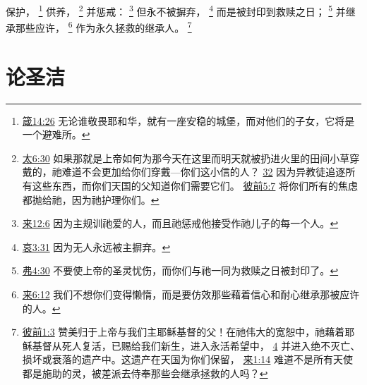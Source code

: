 \documentclass[12pt, a4paper, oneside]{ctexart}
\begin{document}
	保护，
	\footnote {
		\href{https://biblehub.com/proverbs/14-26.htm}{箴14:26} 无论谁敬畏耶和华，就有一座安稳的城堡，而对他们的子女，它将是一个避难所。
	}
	供养，
	\footnote {
		\href{https://biblehub.com/matthew/6-30.htm}{太6:30} 如果那就是上帝如何为那今天在这里而明天就被扔进火里的田间小草穿戴的，祂难道不会更加给你们穿戴---你们这小信的人？
		\href{https://biblehub.com/matthew/6-32.htm}{32} 因为异教徒追逐所有这些东西，而你们天国的父知道你们需要它们。
		\href{https://biblehub.com/1_peter/5-7.htm}{彼前5:7} 将你们所有的焦虑都抛给祂，因为祂护理你们。
	}
	并惩戒：
	\footnote {
		\href{https://biblehub.com/hebrews/12-6.htm}{来12:6} 因为主规训祂爱的人，而且祂惩戒他接受作祂儿子的每一个人。
	}
	但永不被摒弃，
	\footnote {
		\href{https://biblehub.com/lamentations/3-31.htm}{哀3:31} 因为无人永远被主摒弃。
	}
	而是被封印到救赎之日；
	\footnote {
		\href{https://biblehub.com/ephesians/4-30.htm}{弗4:30} 不要使上帝的圣灵忧伤，而你们与祂一同为救赎之日被封印了。
	}
	并继承那些应许，
	\footnote {
		\href{https://biblehub.com/hebrews/6-12.htm}{来6:12} 我们不想你们变得懒惰，而是要仿效那些藉着信心和耐心继承那被应许的人。
	}
	作为永久拯救的继承人。
	\footnote {
		\href{https://biblehub.com/1_peter/1-3.htm}{彼前1:3} 赞美归于上帝与我们主耶稣基督的父！在祂伟大的宽恕中，祂藉着耶稣基督从死人复活，已赐给我们新生，进入永活希望中，
		\href{https://biblehub.com/1_peter/1-4.htm}{4} 并进入绝不灭亡、损坏或衰落的遗产中。这遗产在天国为你们保留，
		\href{https://biblehub.com/hebrews/1-14.htm}{来1:14} 难道不是所有天使都是施助的灵，被差派去侍奉那些会继承拯救的人吗？
	}

\section{论圣洁}
\end{document}
